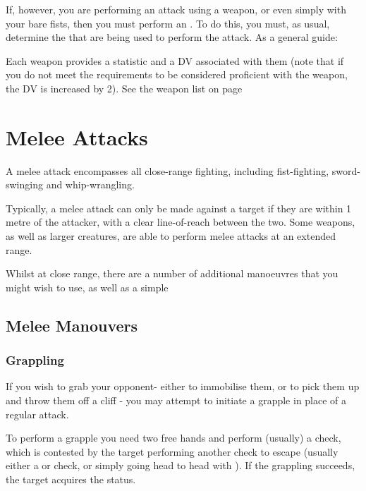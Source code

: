 If, however, you are performing an attack using a weapon, or even simply with your bare fists, then you must perform an . To do this, you must, as usual, determine the  that are being used to perform the attack. As a general guide:
\begin{itemize}
\end{itemize} 

Each weapon provides a  statistic and a DV associated with them (note that if you do not meet the requirements to be considered proficient with the weapon, the DV is increased by 2). See the weapon list on page

\section{Melee Attacks}

A melee attack encompasses all close-range fighting, including fist-fighting, sword-swinging and whip-wrangling. 

Typically, a melee attack can only be made against a target if they are within 1 metre of the attacker, with a clear line-of-reach between the two. Some weapons, as well as larger creatures, are able to perform melee attacks at an extended range. 


Whilst at close range, there are a number of additional manoeuvres that you might wish to use, as well as a simple  

\subsection{Melee Manouvers}
\subsubsection{Grappling}

If you wish to grab your opponent- either to immobilise them, or to pick them up and throw them off a cliff - you may attempt to initiate a grapple in place of a regular attack. 

To perform a grapple you need two free hands and perform (usually) a  check, which is contested by the target performing another check to escape (usually either a  or  check, or simply going head to head with ). If the grappling succeeds, the target acquires the  status. 

